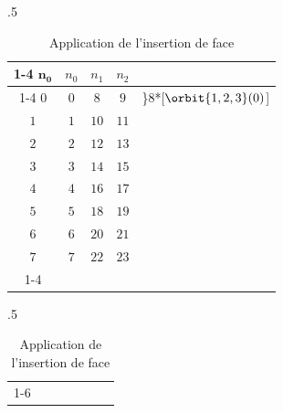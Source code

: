 \begin{table}[htb!]
	\caption{Tableaux de filtrage des sommets créés}
	\label{tab:reevaluation-scripts-alternative-appariement-filtrage-sommets}
	\begin{subtable}[t]{.5\textwidth}
		\caption{Application de la triangulation}
		\label{tab:reevaluation-scripts-alternative-appariement-filtrage-sommets-triangulation}
		\begin{tabular}{|c||c|c|c|l@{\,}}
			\cline{1-4}%
			\(\mathbf{n_{0}}\) & \(n_{0}\) & \(n_{1}\) & \(n_{2}\)                        &                                                   \\
			\cline{1-4}%
			\addlinespace[2pt]%
			\cline{1-4}%
			\(0\)              & {\(0\)}   & {\(8\)}   & \textcolor{mydarkorange}{\(9\)}  & \rdelim\}{8}{*}[\hspace{2pt}\(\orbit{1,2,3}(0)\)] \\
			\(1\)              & {\(1\)}   & {\(10\)}  & \textcolor{mydarkorange}{\(11\)} &                                                   \\
			\(2\)              & {\(2\)}   & {\(12\)}  & \textcolor{mydarkorange}{\(13\)} &                                                   \\
			\(3\)              & {\(3\)}   & {\(14\)}  & \textcolor{mydarkorange}{\(15\)} &                                                   \\
			\(4\)              & {\(4\)}   & {\(16\)}  & \textcolor{mydarkorange}{\(17\)} &                                                   \\
			\(5\)              & {\(5\)}   & {\(18\)}  & \textcolor{mydarkorange}{\(19\)} &                                                   \\
			\(6\)              & {\(6\)}   & {\(20\)}  & \textcolor{mydarkorange}{\(21\)} &                                                   \\
			\(7\)              & {\(7\)}   & {\(22\)}  & \textcolor{mydarkorange}{\(23\)} &                                                   \\
			\cline{1-4}%
		\end{tabular}
	\end{subtable}
	\begin{subtable}[t]{.5\textwidth}
		\raggedleft
		\caption{Application de l'insertion de face}
		\label{tab:reevaluation-scripts-alternative-appariement-filtrage-sommets-insertion}
		\begin{tabular}{|c||c|c|c|c|c|l@{\,}}
			\cline{1-6}%

\end{tabular}
\end{subtable}
\end{table}
